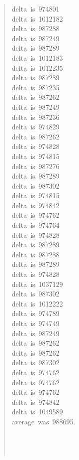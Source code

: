\documentclass[letterpaper]{article}
\begin{document}
\begin{quote}
{delta~is~974801\\
delta~is~1012182\\
delta~is~987288\\
delta~is~987249\\
delta~is~987289\\
delta~is~1012183\\
delta~is~1012235\\
delta~is~987289\\
delta~is~987235\\
delta~is~987262\\
delta~is~987249\\
delta~is~987236\\
delta~is~974829\\
delta~is~987262\\
delta~is~974828\\
delta~is~974815\\
delta~is~987276\\
delta~is~987289\\
delta~is~987302\\
delta~is~974815\\
delta~is~974842\\
delta~is~974762\\
delta~is~974764\\
delta~is~974828\\
delta~is~987289\\
delta~is~987288\\
delta~is~987289\\
delta~is~974828\\
delta~is~1037129\\
delta~is~987302\\
delta~is~1012222\\
delta~is~974789\\
delta~is~974749\\
delta~is~987249\\
delta~is~987262\\
delta~is~987262\\
delta~is~987302\\
delta~is~974762\\
delta~is~974762\\
delta~is~974762\\
delta~is~974842\\
delta~is~1049589\\
average~was~988695.\\
~\\
~\\
~\\
}
\end{quote}
\end{document}
